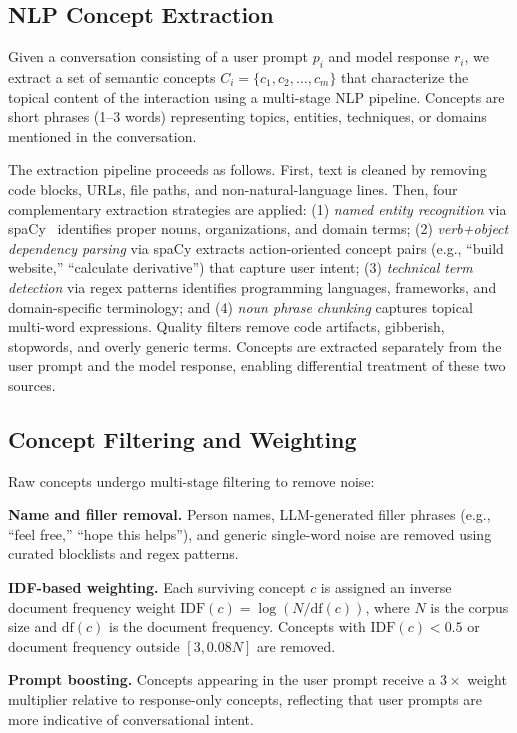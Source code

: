 \documentclass[conference]{IEEEtran}
\begin{document}
\subsection{NLP Concept Extraction}

Given a conversation consisting of a user prompt $p_i$ and model response $r_i$, we extract a set of semantic concepts $C_i = \{c_1, c_2, \ldots, c_m\}$ that characterize the topical content of the interaction using a multi-stage NLP pipeline. Concepts are short phrases (1--3 words) representing topics, entities, techniques, or domains mentioned in the conversation.

The extraction pipeline proceeds as follows. First, text is cleaned by removing code blocks, URLs, file paths, and non-natural-language lines. Then, four complementary extraction strategies are applied: (1) \textit{named entity recognition} via spaCy~\cite{honnibal2020spacy} identifies proper nouns, organizations, and domain terms; (2) \textit{verb+object dependency parsing} via spaCy extracts action-oriented concept pairs (e.g., ``build website,'' ``calculate derivative'') that capture user intent; (3) \textit{technical term detection} via regex patterns identifies programming languages, frameworks, and domain-specific terminology; and (4) \textit{noun phrase chunking} captures topical multi-word expressions. Quality filters remove code artifacts, gibberish, stopwords, and overly generic terms. Concepts are extracted separately from the user prompt and the model response, enabling differential treatment of these two sources.

\subsection{Concept Filtering and Weighting}

Raw concepts undergo multi-stage filtering to remove noise:

\textbf{Name and filler removal.} Person names, LLM-generated filler phrases (e.g., ``feel free,'' ``hope this helps''), and generic single-word noise are removed using curated blocklists and regex patterns.

\textbf{IDF-based weighting.} Each surviving concept $c$ is assigned an inverse document frequency weight $\text{IDF}(c) = \log(N / \text{df}(c))$, where $N$ is the corpus size and $\text{df}(c)$ is the document frequency. Concepts with $\text{IDF}(c) < 0.5$ or document frequency outside $[3, 0.08N]$ are removed.

\textbf{Prompt boosting.} Concepts appearing in the user prompt receive a $3\times$ weight multiplier relative to response-only concepts, reflecting that user prompts are more indicative of conversational intent.
\end{document}
